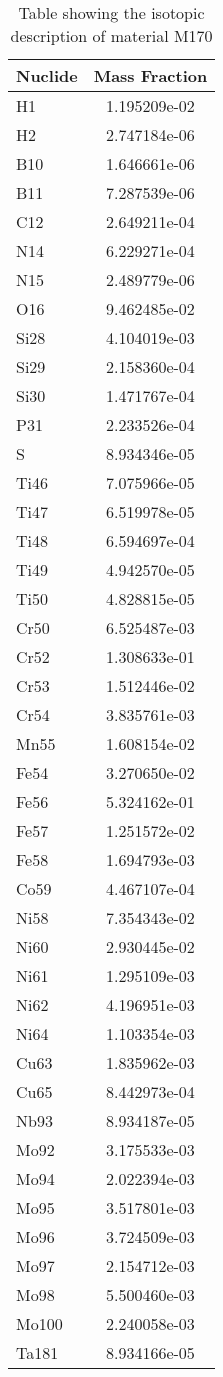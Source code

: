 \begin{centering}
\begin{table}[ht!]
\begin{tabular}{l | c}
\hline
Nuclide & Mass Fraction\\
\hline
H1 & 1.195209e-02\\
H2 & 2.747184e-06\\
B10 & 1.646661e-06\\
B11 & 7.287539e-06\\
C12 & 2.649211e-04\\
N14 & 6.229271e-04\\
N15 & 2.489779e-06\\
O16 & 9.462485e-02\\
Si28 & 4.104019e-03\\
Si29 & 2.158360e-04\\
Si30 & 1.471767e-04\\
P31 & 2.233526e-04\\
S & 8.934346e-05\\
Ti46 & 7.075966e-05\\
Ti47 & 6.519978e-05\\
Ti48 & 6.594697e-04\\
Ti49 & 4.942570e-05\\
Ti50 & 4.828815e-05\\
Cr50 & 6.525487e-03\\
Cr52 & 1.308633e-01\\
Cr53 & 1.512446e-02\\
Cr54 & 3.835761e-03\\
Mn55 & 1.608154e-02\\
Fe54 & 3.270650e-02\\
Fe56 & 5.324162e-01\\
Fe57 & 1.251572e-02\\
Fe58 & 1.694793e-03\\
Co59 & 4.467107e-04\\
Ni58 & 7.354343e-02\\
Ni60 & 2.930445e-02\\
Ni61 & 1.295109e-03\\
Ni62 & 4.196951e-03\\
Ni64 & 1.103354e-03\\
Cu63 & 1.835962e-03\\
Cu65 & 8.442973e-04\\
Nb93 & 8.934187e-05\\
Mo92 & 3.175533e-03\\
Mo94 & 2.022394e-03\\
Mo95 & 3.517801e-03\\
Mo96 & 3.724509e-03\\
Mo97 & 2.154712e-03\\
Mo98 & 5.500460e-03\\
Mo100 & 2.240058e-03\\
Ta181 & 8.934166e-05
\end{tabular}
\caption{Table showing the isotopic description of material M170}
\label{table:material_M170}
\end{table}\clearpage


\end{centering}

